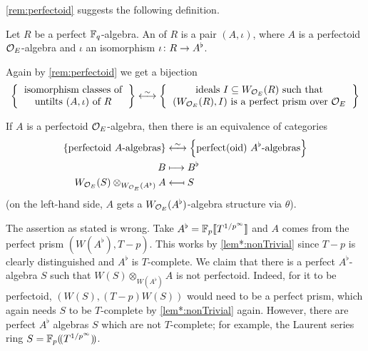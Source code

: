 \cref{rem:perfectoid} suggests the following definition.
\begin{defi}
	Let $R$ be a perfect $\mathbb{F}_q$-algebra. An  of $R$ is a pair $(A,\iota)$, where $A$ is a perfectoid $\mathcal{O}_E$-algebra and $\iota$ an isomorphism $\iota\colon R\morphism A^\flat$.
\end{defi}
Again by \cref{rem:perfectoid} we get a bijection
\begin{equation*}
	\left\{\begin{tabular}{c}
		isomorphism classes of\\
		untilts $(A,\iota)$ of $R$
	\end{tabular}\right\}\lrisomorphism \left\{\begin{tabular}{c}
	ideals $I\subseteq W_{\Oo_E}(R)$ such that\\ $(W_{\Oo_E}(R),I)$
	is a perfect prism over $\Oo_E$
	\end{tabular}\right\}
\end{equation*}
\begin{exc}\label{exc:tilting}
	If $A$ is a perfectoid $\mathcal{O}_E$-algebra, then there is an equivalence of categories
	\begin{align*}
		\left\{\text{perfectoid $A$-algebras}\right\}&\lrisomorphism \left\{\text{perfect(oid) $A^\flat$-algebras}\right\}\\
		B&\longmapsto B^\flat\\
		W_{\Oo_E}(S)\otimes_{W_{\Oo_E}(A^\flat)}A&\longmapsfrom S
	\end{align*}
	(on the left-hand side, $A$ gets a $W_{\mathcal{O}_E}(A^\flat)$-algebra structure via $\theta$).
\end{exc}
\begin{proof*}[Disproof]
	The assertion as stated is wrong. Take $A^\flat=\mathbb{F}_p\llbracket T^{1/p^\infty}\rrbracket$ and $A$ comes from the perfect prism $(W(A^\flat),T-p)$. This works by \cref{lem*:nonTrivial} since $T-p$ is clearly distinguished and $A^\flat$ is $T$-complete. We claim that there is a perfect $A^\flat$-algebra $S$ such that $W(S)\otimes_{W(A^\flat)}A$ is not perfectoid. Indeed, for it to be perfectoid, $(W(S),(T-p)W(S))$ would need to be a perfect prism, which again needs $S$ to be $T$-complete by \cref{lem*:nonTrivial} again. However, there are perfect $A^\flat$ algebras $S$ which are not $T$-complete; for example, the Laurent series ring $S=\mathbb{F}_p(\!(T^{1/p^\infty})\!)$.
\end{proof*}
